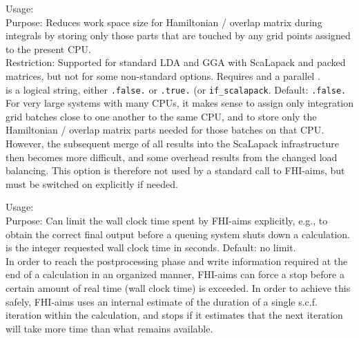 {
  \noindent
  Usage:   \\[1.0ex]
  Purpose: Reduces work space size for Hamiltonian / overlap matrix
    during integrals by storing only those parts that are touched by 
    any grid points assigned to the present CPU. \\[1.0ex]
  Restriction: Supported for standard LDA and GGA with ScaLapack and
    packed matrices, but not for some non-standard options. Requires
     and a parallel
    . \\[1.0ex]
   is a logical string, either \texttt{.false.} or
    \texttt{.true.} (or \texttt{if\_scalapack}. Default: \texttt{.false.} \\  
}
For very large systems with many CPUs, it makes sense to assign only
integration grid batches close to one another to the same CPU, and to
store only the Hamiltonian / overlap matrix parts needed for those
batches on that CPU. However, the subsequent merge of all results into
the ScaLapack infrastructure then becomes more difficult, and some
overhead results from the changed load balancing. This option is
therefore not used by a standard call to FHI-aims, but must be
switched on explicitly if needed. 

{
  \noindent
  Usage:   \\[1.0ex]
  Purpose: Can limit the wall clock time spent by FHI-aims explicitly,
    e.g., to obtain the correct final output before a queuing system 
    shuts down a calculation. \\[1.0ex]
   is the integer requested wall clock time in
    seconds. Default: no limit. \\
}
In order to reach the postprocessing phase and write information
required at the end of a calculation in an organized manner,
FHI-aims can force a stop before a certain amount of real time (wall
clock time) is exceeded. In order to achieve this safely, FHI-aims
uses an internal estimate of the duration of a single s.c.f. iteration
within the calculation, and stops if it estimates that the next
iteration will take more time than what remains available.
